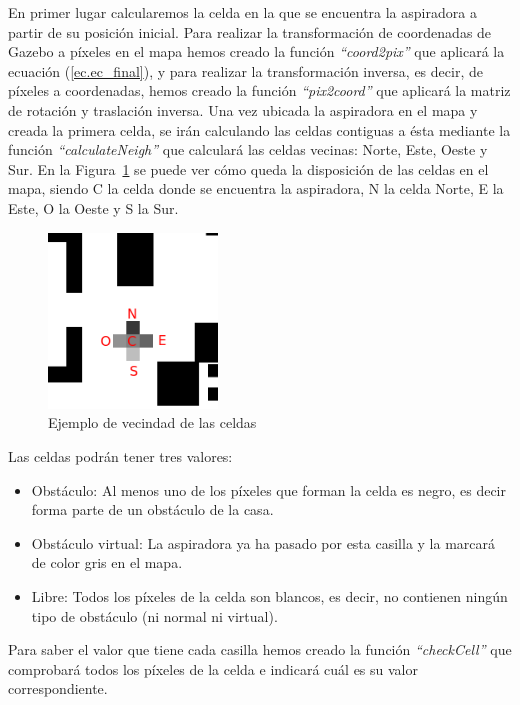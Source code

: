En primer lugar calcularemos la celda en la que se encuentra la aspiradora a partir de su posición inicial. Para realizar la transformación de coordenadas de Gazebo a píxeles en el mapa hemos creado la función \textit{``coord2pix''} que aplicará la ecuación (\ref{ec.ec_final}), y para realizar la transformación inversa, es decir, de píxeles a coordenadas, hemos creado la función \textit{``pix2coord''} que aplicará la matriz de rotación y traslación inversa. Una vez ubicada la aspiradora en el mapa y creada la primera celda, se irán calculando las celdas contiguas a ésta mediante la función \textit{``calculateNeigh''} que calculará las celdas vecinas: Norte, Este, Oeste y Sur. En la Figura~\ref{fig.neighZoom} se puede ver cómo queda la disposición de las celdas en el mapa, siendo C la celda donde se encuentra la aspiradora, N la celda Norte, E la Este, O la Oeste y S la Sur.

\begin{figure}[H]
  \begin{center}
    \includegraphics[width=0.4\textwidth]{figures/Vacuum/neighZoom.png}
		\caption{Ejemplo de vecindad de las celdas}
		\label{fig.neighZoom}
		\end{center}
\end{figure}

Las celdas podrán tener tres valores:

\begin{itemize}
\item Obstáculo: Al menos uno de los píxeles que forman la celda es negro, es decir forma parte de un obstáculo de la casa.
\item Obstáculo virtual: La aspiradora ya ha pasado por esta casilla y la marcará de color gris en el mapa. 
\item Libre: Todos los píxeles de la celda son blancos, es decir, no contienen ningún tipo de obstáculo (ni normal ni virtual).
\end{itemize}

Para saber el valor que tiene cada casilla hemos creado la función \textit{``checkCell''} que comprobará todos los píxeles de la celda e indicará cuál es su valor correspondiente.\\

